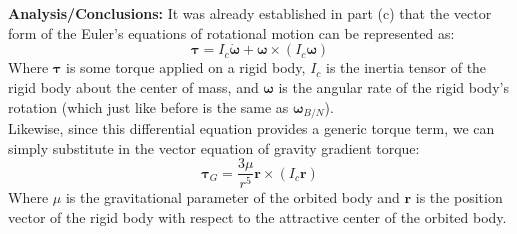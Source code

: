 \documentclass[titlepage]{article}
\begin{document}
\textbf{Analysis/Conclusions:}
It was already established in part (c) that the vector form of the Euler's equations of rotational motion can be represented as:
\begin{equation}
	\boldsymbol{\tau}=I_c\dot{\boldsymbol{\omega}}+\boldsymbol{\omega}\times\left(I_c\boldsymbol{\omega}\right)
\end{equation}
Where $\boldsymbol{\tau}$ is some torque applied on a rigid body, $I_c$ is the inertia tensor of the rigid body about the center of mass, and $\boldsymbol{\omega}$ is the angular rate of the rigid body's rotation (which just like before is the same as $\boldsymbol{\omega}_{B/N}$).\\

Likewise, since this differential equation provides a generic torque term, we can simply substitute in the vector equation of gravity gradient torque:
\begin{equation}
	\boldsymbol{\tau}_G=\frac{3\mu}{r^5}\boldsymbol{r}\times\left(I_c\boldsymbol{r}\right)
\end{equation}
Where $\mu$ is the gravitational parameter of the orbited body and $\boldsymbol{r}$ is the position vector of the rigid body with respect to the attractive center of the orbited body.\\
\end{document}
